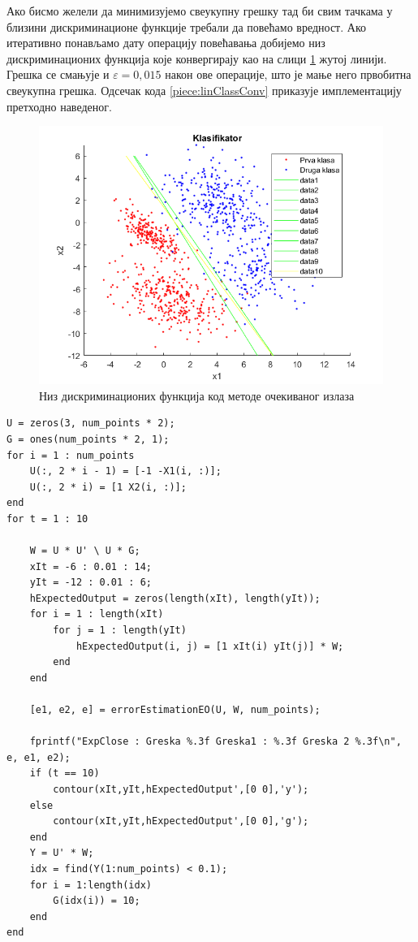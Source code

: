 Ако бисмо желели да минимизујемо свеукупну грешку тад би свим тачкама у близини дискриминационе функције требали да повећамо вредност.  Ако итеративно понављамо дату операцију повећавања добијемо низ дискриминационих функција које конвергирају као на слици \ref{fig:expClassConv} жутој линији. Грешка се смањује и $\varepsilon =0,015$ након ове операције, што је мање него првобитна свеукупна грешка. Одсечак кода \ref{piece:linClassConv} приказује имплементацију претходно наведеног. 
\begin{figure}[htb!]
\centering
\includegraphics[scale=1]{pictures/3/ExpClassConv}
\caption{Низ дискриминационих функција код методе очекиваног излаза}\label{fig:expClassConv}
\end{figure}

\begin{lstlisting}[caption={Метода очекиваног излаза - конвергирање},label={piece:linClassConv}]
U = zeros(3, num_points * 2);
G = ones(num_points * 2, 1);
for i = 1 : num_points
    U(:, 2 * i - 1) = [-1 -X1(i, :)];
    U(:, 2 * i) = [1 X2(i, :)];
end
for t = 1 : 10

    W = U * U' \ U * G;
    xIt = -6 : 0.01 : 14;
    yIt = -12 : 0.01 : 6;
    hExpectedOutput = zeros(length(xIt), length(yIt));
    for i = 1 : length(xIt)
        for j = 1 : length(yIt)
            hExpectedOutput(i, j) = [1 xIt(i) yIt(j)] * W;
        end
    end

    [e1, e2, e] = errorEstimationEO(U, W, num_points);

    fprintf("ExpClose : Greska %.3f Greska1 : %.3f Greska 2 %.3f\n", e, e1, e2);
    if (t == 10)
        contour(xIt,yIt,hExpectedOutput',[0 0],'y');
    else
        contour(xIt,yIt,hExpectedOutput',[0 0],'g');
    end
    Y = U' * W;
    idx = find(Y(1:num_points) < 0.1);
    for i = 1:length(idx)
        G(idx(i)) = 10;
    end
end
\end{lstlisting}


